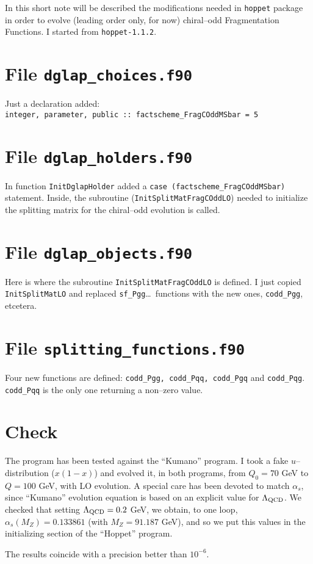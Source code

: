 \documentclass[12pt]{article}
\begin{document}
In this short note will be described the modifications needed in {\tt hoppet} package in order to evolve
(leading order only, for now) chiral--odd Fragmentation Functions. I started from {\tt hoppet-1.1.2}.

\section{File {\tt dglap\_choices.f90}}

Just a declaration added:\\
\noindent
{\tt integer, parameter, public :: factscheme\_FragCOddMSbar = 5}\\

\section {File {\tt dglap\_holders.f90}}

In function {\tt InitDglapHolder} added a {\tt case (factscheme\_FragCOddMSbar)} statement. Inside,
the subroutine ({\tt InitSplitMatFragCOddLO}) needed to initialize the splitting matrix for 
the chiral--odd evolution is called.

\section {File {\tt dglap\_objects.f90}}

Here is where the subroutine {\tt InitSplitMatFragCOddLO} is defined. I just copied {\tt InitSplitMatLO}
and replaced {\tt sf\_Pgg}\dots\ functions with the new ones, {\tt codd\_Pgg}, etcetera.

\section {File {\tt splitting\_functions.f90}}

Four new functions are defined: {\tt codd\_Pgg, codd\_Pqq, codd\_Pgq} and {\tt codd\_Pqg}. 
{\tt codd\_Pqq} is the only one returning a non--zero value.

\section {Check}

The program has been tested against the ``Kumano'' program. I took a fake $u$--distribution ($x(1-x)$) and 
evolved it, in both programs, from $Q_0 = 70$ GeV to $Q = 100$ GeV, with LO evolution. A special care 
has been devoted to match $\alpha_s$, since ``Kumano'' evolution equation is based on an explicit value 
for $\Lambda_{\rm QCD}$. We checked that setting $\Lambda_{\rm QCD} = 0.2$ GeV, we obtain, to one loop, 
$\alpha_s(M_Z) = 0.133861$ (with $M_Z = 91.187$ GeV), and so we put this values in the initializing section 
of the ``Hoppet'' program.

The results coincide with a precision better than $10^{-6}$.
\end{document}

